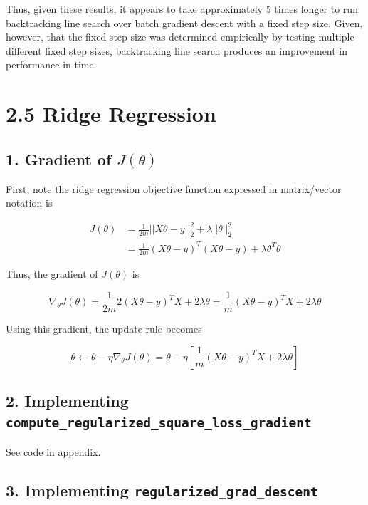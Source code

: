 \documentclass[paper=a4, fontsize=11pt]{scrartcl} %
\numberwithin{equation}{section} %
\numberwithin{figure}{section} %
\numberwithin{table}{section} %
\begin{document}
Thus, given these results, it appears to take approximately 5 times longer to run backtracking line search over batch gradient descent with a fixed step size. Given, however, that the fixed step size was determined empirically by testing multiple different fixed step sizes, backtracking line search produces an improvement in performance in time.


\section*{2.5 Ridge Regression}

\subsection*{1. Gradient of $J(\theta)$}

First, note the ridge regression objective function expressed in matrix/vector notation is

\begin{align*}
J(\theta) &= \frac{1}{2m} ||X \theta - y||_2^2 + \lambda ||\theta||_2^2 \\
   &= \frac{1}{2m} (X \theta - y)^T(X \theta - y) + \lambda \theta^T \theta
\end{align*}

Thus, the gradient of $J(\theta)$ is

\[
\nabla_{\theta} J(\theta) = \frac{1}{2m} 2 (X \theta - y)^T X + 2 \lambda \theta = \frac{1}{m} (X \theta - y)^T X + 2 \lambda \theta
\]

Using this gradient, the update rule becomes

\[
\theta \leftarrow \theta - \eta \nabla_{\theta} J(\theta) =  \theta - \eta \left[\frac{1}{m} (X \theta - y)^T X + 2 \lambda \theta \right]
\]

\subsection*{2. Implementing \texttt{compute\_regularized\_square\_loss\_gradient}}

See code in appendix.

\subsection*{3. Implementing \texttt{regularized\_grad\_descent}}
\end{document}
